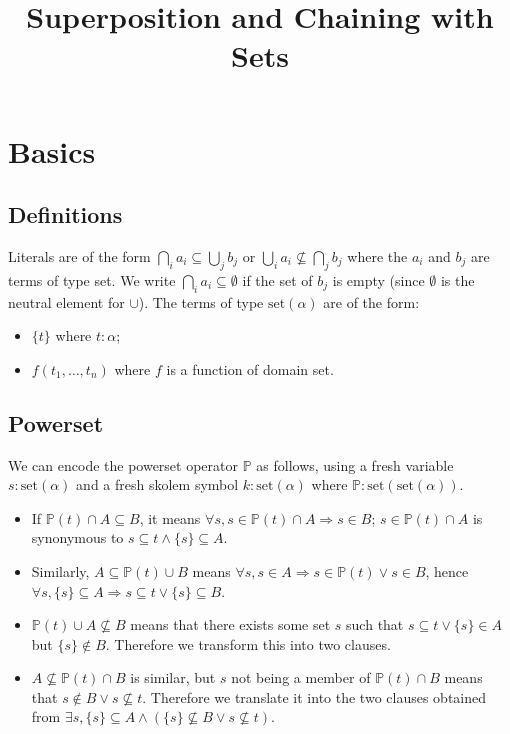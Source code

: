 \documentclass{article}
\title{Superposition and Chaining with Sets}
\newcommand{\set}[1]{\ensuremath{\text{set}({#1})}}
\begin{document}
\maketitle


\section{Basics}

\subsection{Definitions}
Literals are of the form $\bigcap_i a_i \subseteq \bigcup_j b_j$
or $\bigcup_i a_i \not\subseteq \bigcap_j b_j$
where the $a_i$ and $b_j$ are terms of type set.
We write
$\bigcap_i a_i \subseteq \emptyset$ if the set of $b_j$ is empty (since
$\emptyset$ is the neutral element for $\cup$).
The terms of type $\set{\alpha}$
are of the form:

\begin{itemize}
    \item $\{ t \}$ where $t : \alpha$;
    \item $ f(t_1,\dots,t_n) $ where $f$ is a function of domain set.
\end{itemize}

\subsection{Powerset}
\noindent{}We can encode the powerset operator $\mathbb{P}$ as follows, using a fresh
variable $s:\set{\alpha}$ and a fresh skolem
symbol $k:\set{\alpha}$ where $\mathbb{P}: \set{\set{\alpha}}$.
\begin{itemize}
\item If $\mathbb{P}(t) \cap A \subseteq B$,
    it means $\forall s, s\in \mathbb{P}(t) \cap A \Rightarrow s \in B$;
    $s \in \mathbb{P}(t) \cap A$ is synonymous to $s \subseteq t \land
    \{ s \} \subseteq A$.
\item Similarly, $A \subseteq \mathbb{P}(t) \cup B$
    means $\forall s, s\in A \Rightarrow s \in \mathbb{P}(t) \lor s\in B$,
    hence $\forall s, \{s \}\subseteq A \Rightarrow s \subseteq t \lor \{ s \} \subseteq B$.
\item $\mathbb{P}(t) \cup A \not\subseteq B$ means that there exists
    some set $s$ such that $s \subseteq t \lor \{s\} \in A$ but $\{s\} \not\in B$.
    Therefore we transform this into two clauses.
\item $A \not\subseteq \mathbb{P}(t) \cap B$ is similar, but $s$ not being
    a member of $\mathbb{P}(t)\cap B$ means that $s \not\in B \lor s\not\subseteq t$.
    Therefore we translate it into the two clauses obtained from
    $\exists s, \{s\} \subseteq A \land (\{s\}\not\subseteq B \lor s\not\subseteq t)$.
\end{itemize}
\end{document}
